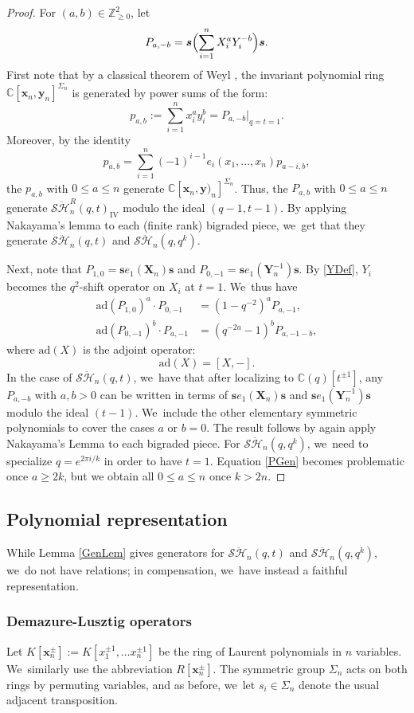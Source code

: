 \documentclass[11pt]{article}
\theoremstyle{definition}
\newcommand{\ZZ}{\mathbb{Z}}
\newcommand{\CC}{\mathbb{C}}
\newcommand{\SHH}{\mathcal{S}\ddot{\mathcal{H}}}
\newcommand{\ee}{\boldsymbol{s}}
\newcommand{\xx}{\boldsymbol{x}}
\newcommand{\ad}{\mathrm{ad}}
\begin{document}
\begin{proof}
For $(a,b)\in\ZZ_{\ge 0}^2$, let
\[
P_{a,-b}=\ee\Bigl(\sum_{i=1}^nX_i^aY_i^{-b}\Bigr)\ee.
\]
First note that by a classical theorem of Weyl \cite{WeylInv}, the invariant polynomial ring $\CC[\boldsymbol{x}_n,\boldsymbol{y}_n]^{\Sigma_n}$ is generated by power sums of the form:
\[
p_{a,b}:=\sum_{i=1}^n x_i^ay_i^{b}=P_{a,-b}\big|_{q=t=1}.
\]
Moreover, by the identity
\[
p_{a,b}=\sum_{i=1}^n(-1)^{i-1}e_i(x_1,\ldots, x_n)p_{a-i,b},
\]
the $p_{a,b}$ with $0\le a\le n$ generate $\CC[\boldsymbol{x}_n,\boldsymbol{y})_n]^{\Sigma_n}$.
Thus, the $P_{a,b}$ with $0\le a\le n$ generate $\SHH_n^R(q,t)_{\mathrm{IV}}$ modulo the ideal $(q-1, t-1)$.
By applying Nakayama's lemma to each (finite rank) bigraded piece, we~get that they generate $\SHH_n(q,t)$ and $\SHH_n(q,q^k)$.

Next, note that $P_{1,0}=\ee e_1(\boldsymbol{X}_n)\ee$ and $P_{0,-1}=\ee e_1(\boldsymbol{Y}_n^{-1})\ee$.
By \eqref{YDef}, $Y_i$ becomes the $q^2$-shift operator on $X_i$ at $t=1$. We~thus have
\begin{align}
\nonumber
\ad\left(P_{1,0} \right)^a\cdot P_{0,-1}&= (1-q^{-2})^aP_{a, -1},\\
\ad\left(P_{0,-1} \right)^b \cdot P_{a, -1}&= (q^{-2a}-1)^bP_{a, -1-b},
\label{PGen}
\end{align}
where $\ad\left(X \right)$ is the adjoint operator:
\[
\ad\left(X \right)=[X,-].
\]
In the case of $\SHH_n(q,t)$, we~have that after localizing to $\CC(q)[t^{\pm 1}]$, any $P_{a,-b}$ with $a,b>0$ can be written in terms of $\ee e_1(\boldsymbol{X}_n)\ee$ and $\ee e_1(\boldsymbol{Y}_n^{-1})\ee$ modulo the ideal $(t-1)$. We~include the other elementary symmetric polynomials to cover the cases $a$ or $b=0$.
The result follows by again apply Nakayama's Lemma to each bigraded piece.
For $\SHH_n(q,q^k)$, we~need to specialize $q=e^{2\pi i/k}$ in order to have $t=1$.
Equation \eqref{PGen} becomes problematic once $a\ge 2k$, but we obtain all $0\le a\le n$ once $k> 2n$.
\end{proof}

\subsection{Polynomial representation}\label{PolRep}
While Lemma \ref{GenLem} gives generators for $\SHH_n(q,t)$ and $\SHH_n(q,q^k)$, we~do not have relations; in compensation, we~have instead a faithful representation.

\subsubsection{Demazure-Lusztig operators}
Let $K[\xx_n^\pm]:=K[x_1^{\pm 1},\ldots x_{n}^{\pm 1}]$ be the ring of Laurent polynomials in $n$ variables. We~similarly use the abbreviation $R[\xx_n^\pm]$.
The symmetric group $\Sigma_n$ acts on both rings by permuting variables, and as before, we~let $s_i\in\Sigma_n$ denote the usual adjacent transposition.
\end{document}

